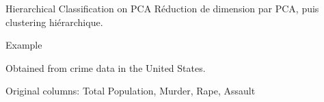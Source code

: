 \begin{frame}{Hierarchical Classification on PCA}
  Réduction de dimension par PCA, puis clustering hiérarchique.

\end{frame}

\begin{frame}{Example}

  Obtained from crime data in the United States.

  Original columns: Total Population, Murder, Rape, Assault
\end{frame}
